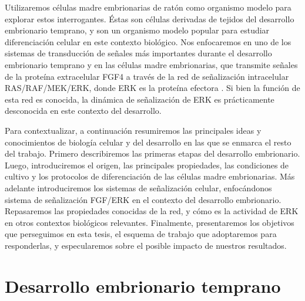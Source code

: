 \documentclass[./main.tex]{subfiles}
\begin{document}
Utilizaremos células madre embrionarias de ratón como organismo modelo para explorar estos interrogantes. Éstas son células derivadas de tejidos del desarrollo embrionario temprano, y son un organismo modelo popular para estudiar diferenciación celular en este contexto biológico. Nos enfocaremos en uno de los sistemas de transducción de señales más importantes durante el desarrollo embrionario temprano y en las células madre embrionarias, que transmite señales de la proteína extracelular FGF4 a través de la red de señalización intracelular RAS/RAF/MEK/ERK, donde ERK es la proteína efectora \cite{Brewer2016}. Si bien la función de esta red es conocida, la dinámica de señalización de ERK es prácticamente desconocida en este contexto del desarrollo. 




Para contextualizar, a continuación resumiremos las principales ideas y conocimientos de biología celular y del desarrollo en las que se enmarca el resto del trabajo. Primero describiremos las primeras etapas del desarrollo embrionario. Luego, introduciremos el origen, las principales propiedades, las condiciones de cultivo y los protocolos de diferenciación de las células madre embrionarias. Más adelante introduciremos los sistemas de señalización celular, enfocándonos sistema de señalización FGF/ERK en el contexto del desarrollo embrionario. Repasaremos las propiedades conocidas de la red, y cómo es la actividad de ERK en otros contextos biológicos relevantes. Finalmente, presentaremos los objetivos que perseguimos en esta tesis, el esquema de trabajo que adoptaremos para responderlas, y especularemos sobre el posible impacto de nuestros resultados.



\section{Desarrollo embrionario temprano}
\label{C1_sec:desarrollo_embrionario_temprano}
\end{document}
